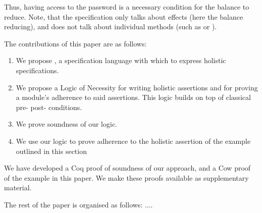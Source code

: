  
 Thus, having access to the password is a necessary condition for the balance to reduce.
 Note, that the specification only talks about effects (here the balance reducing), and does not
 talk about individual methods (such as  or ).
 
   
 The contributions of this paper are as follows:
 
 \begin{enumerate}
 \item
 We propose \Chainmail, a specification language with which to
express holistic specifications. 
 \item
  We propose a Logic of Necessity for writing holistic assertions and for proving a module's adherence to said assertions.
 This logic builds on top of classical pre- post- conditions.
 \item
 We prove soundness of our logic.  
 \item
 We use our logic to prove adherence to the holistic assertion of the example
outlined  in this section
 \end{enumerate}
 
 We have developed a Coq proof of soundness of our approach, and a Cow proof of the
 example in this paper. We make these proofs available as supplementary material.


The rest of the paper is organised as follows: .... 




